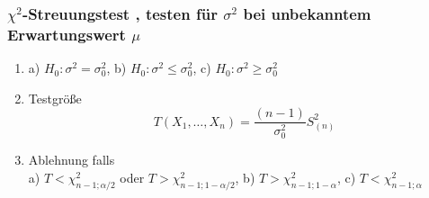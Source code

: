 \documentclass[
ngerman,
accentcolor=9c,%
type=intern,
marginpar=false
]{tudapub}
\begin{document}
        \subsubsection*{$\chi^2$-Streuungstest , testen für $\sigma^2$ bei unbekanntem Erwartungswert $\mu$}
            \begin{enumerate}
                \item a) $H_0: \sigma^2 = \sigma^2_0$, b) $H_0: \sigma^2 \leq \sigma^2_0$, c) $H_0: \sigma^2 \geq \sigma^2_0$
                \item Testgröße
                \begin{equation*}
                    T(X_1,\dots,X_n)=\dfrac{(n-1)}{\sigma^2_0}S^2_{(n)}
                \end{equation*}
                \item Ablehnung falls\\
                a) $T<\chi^2_{n-1;\alpha/2}$ oder $T>\chi^2_{n-1;1-\alpha/2}$,
                b) $T>\chi^2_{n-1;1-\alpha}$,
                c) $T<\chi^2_{n-1;\alpha}$
            \end{enumerate}
\end{document}

